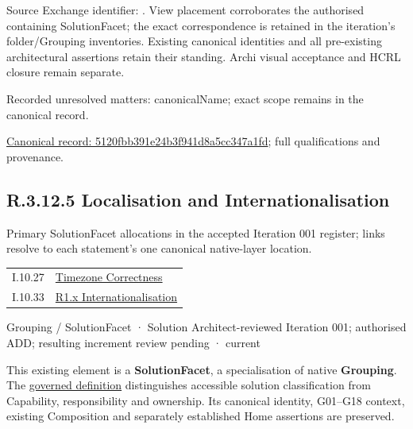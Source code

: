 Source Exchange identifier: \texttt{}. View placement corroborates
the authorised containing SolutionFacet; the exact correspondence is retained in the
iteration's folder/Grouping inventories. Existing canonical identities and all
pre-existing architectural assertions retain their standing. Archi visual
acceptance and HCRL closure remain separate.


{\small Recorded unresolved matters: canonicalName; exact scope remains in the canonical record.}\par
{\footnotesize \href{../../../../../../../continuum/grouping/5120fbb391e24b3f941d8a5cc347a1fd.md}{Canonical record: 5120fbb391e24b3f941d8a5cc347a1fd}; full qualifications and provenance.}\par
\subsection*{R.3.12.5 Localisation and Internationalisation}
\label{navigation:R.3.12.5}

Primary SolutionFacet allocations in the accepted Iteration 001 register; links resolve to each statement’s one canonical native-layer location.\par
\begin{longtable}{p{.22\linewidth}p{.73\linewidth}}
I.10.27 & \hyperref[element:3da1fba95a00438db09c342dfba8b693]{Timezone Correctness} \\
I.10.33 & \hyperref[element:920606fdc7c14a27b7e39a08105c77b6]{R1.x Internationalisation} \\
\end{longtable}
\label{element:77cd076a5bdf463a93fe330698d9be19}
{\small Grouping / SolutionFacet · Solution Architect-reviewed Iteration 001; authorised ADD; resulting increment review pending · current}\par

This existing element is a \textbf{SolutionFacet}, a specialisation of native
\textbf{Grouping}. The \href{\detokenize{../../../../../../../governance/continuum-representation.md#solutionfacet-classification--1119-candidate}}{governed definition}
distinguishes accessible solution classification from Capability, responsibility
and ownership. Its canonical identity, G01–G18 context, existing Composition
and separately established Home assertions are preserved.



